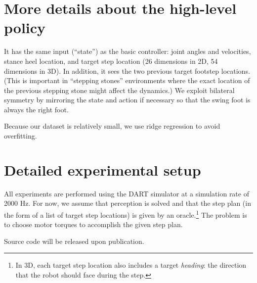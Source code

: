 \documentclass[conference]{IEEEtran}
\begin{document}
\section{More details about the high-level policy}

It has the same input (``state'') as the basic controller: joint angles and velocities, stance heel location, and target step location (26 dimensions in 2D, 54 dimensions in 3D).
In addition, it sees the two previous target footstep locations.
(This is important in ``stepping stones'' environments where the exact location of the previous stepping stone might affect the dynamics.)
We exploit bilateral symmetry by mirroring the state and action if necessary so that the swing foot is always the right foot.

Because our dataset is relatively small, we use ridge regression to avoid overfitting.

\section{Detailed experimental setup}

All experiments are performed using the DART simulator at a simulation rate of 2000 Hz.
For now, we assume that perception is solved and that the step plan (in the form of a list of target step locations) is given by an oracle.\footnote{
In 3D, each target step location also includes a target \emph{heading}: the direction that the robot should face during the step.}
The problem is to choose motor torques to accomplish the given step plan.

Source code will be released upon publication.
\end{document}
